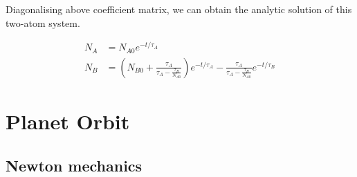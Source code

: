 \documentclass[11pt]{article}
\begin{document}
Diagonalising above coefficient matrix, we can obtain the analytic
solution of this two-atom system.

\begin{align}
    N_A &= N_{A0} e^{-t/\tau_A}\\
    N_B &= (N_{B0} + \frac{\tau_A}{\tau_A - \frac{\tau_B}{N_{A0}}}) e^{-t/\tau_A}%
            - \frac{\tau_A}{\tau_A - \frac{\tau_B}{N_{A0}}}e^{-t/\tau_B}
\end{align}

    \section{Planet Orbit}\label{planet-orbit}

    \subsection{Newton mechanics}\label{newton-mechanics}
\end{document}
